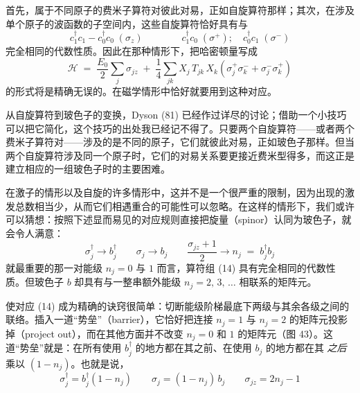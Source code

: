 首先，属于不同原子的费米子算符对彼此对易，正如自旋算符那样；其次，在涉及单个原子的波函数的子空间内，这些自旋算符恰好具有与
\begin{equation*}
c_1^{\dagger} c_1 - c_0^{\dagger} c_0 \;(\sigma_z) \qquad\qquad c_1^{\dagger} c_0 \;(\sigma^{+}); \quad c_0^{\dagger} c_1 \;(\sigma^{-})
\end{equation*}
完全相同的代数性质。因此在那种情形下，把哈密顿量写成
\begin{equation*}
\mathcal{H} \;=\; \frac{E_0}{2} \sum_j \sigma_{jz} \;+\; \frac{1}{4} \sum_{jk} X_j\, T_{jk}\, X_k \left( \sigma_j^{+} \sigma_k^{-} + \sigma_j^{-} \sigma_k^{+} \right)
\end{equation*}
的形式将是精确无误的。在磁学情形中恰好就要用到这种对应。

从自旋算符到玻色子的变换，Dyson (81) 已经作过详尽的讨论；借助一个小技巧可以把它简化，这个技巧的出处我已经记不得了。只要两个自旋算符——或者两个费米子算符对——涉及的是不同的原子，它们就彼此对易，正如玻色子那样。但当两个自旋算符涉及同一个原子时，它们的对易关系要更接近费米型得多，而这正是建立相应的一组玻色子时的主要困难。

在激子的情形以及自旋的许多情形中，这并不是一个很严重的限制，因为出现的激发总数相当少，从而它们相遇重合的可能性可以忽略。在这样的情形下，我们或许可以猜想：按照下述显而易见的对应规则直接把旋量（spinor）认同为玻色子，就会令人满意：
\begin{equation*}
\sigma_j^{\dagger} \rightarrow b_j^{\dagger} \qquad \sigma_j \rightarrow b_j \qquad \frac{\sigma_{jz} + 1}{2} \rightarrow n_j \;=\; b_j^{\dagger} b_j \tag{14}
\end{equation*}
就最重要的那一对能级 $n_j = 0$ 与 $1$ 而言，算符组 (14) 具有完全相同的代数性质。但玻色子 $b$ 却具有与一整串额外能级 $n_j = 2,\, 3,\, \ldots$ 相联系的矩阵元。

使对应 (14) 成为精确的诀窍很简单：切断能级阶梯最底下两级与其余各级之间的联络。插入一道“势垒”（barrier），它恰好把连接 $n_j = 1$ 与 $n_j = 2$ 的矩阵元投影掉（project out），而在其他方面并不改变 $n_j = 0$ 和 $1$ 的矩阵元（图 43）。这道“势垒”就是：在所有使用 $b_j^{\dagger}$ 的地方都在其之前、在使用 $b_j$ 的地方都在其 \emph{之后} 乘以 $(1-n_j)$。也就是说，
\begin{equation*}
\sigma_j^{\dagger} = b_j^{\dagger}(1-n_j) \qquad \sigma_j = (1-n_j)\, b_j \qquad \sigma_{jz} = 2n_j - 1
\end{equation*}


